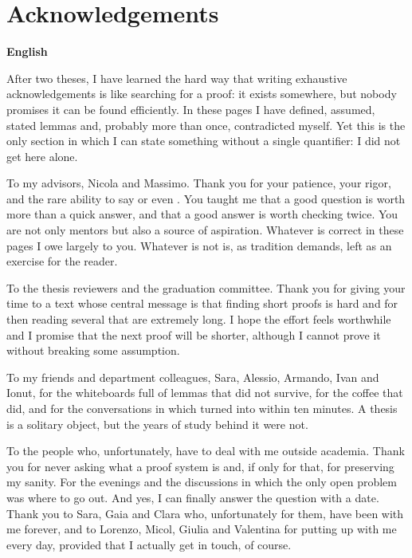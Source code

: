 \chapter*{Acknowledgements}

\noindent
\textbf{English}

\noindent
After two theses, I have learned the hard way that writing exhaustive acknowledgements is like searching for a proof: it exists somewhere, but nobody promises it can be found efficiently. In these pages I have defined, assumed, stated lemmas and, probably more than once, contradicted myself. Yet this is the only section in which I can state something without a single quantifier: I did not get here alone.

To my advisors, Nicola and Massimo. Thank you for your patience, your rigor, and the rare ability to say  or even . You taught me that a good question is worth more than a quick answer, and that a good answer is worth checking twice. You are not only mentors but also a source of aspiration. Whatever is correct in these pages I owe largely to you. Whatever is not is, as tradition demands, left as an exercise for the reader.

To the thesis reviewers and the graduation committee. Thank you for giving your time to a text whose central message is that finding short proofs is hard and for then reading several that are extremely long. I hope the effort feels worthwhile and I promise that the next proof will be shorter, although I cannot prove it without breaking some assumption.

To my friends and department colleagues, Sara, Alessio, Armando, Ivan and Ionut, for the whiteboards full of lemmas that did not survive, for the coffee that did, and for the conversations in which  turned into  within ten minutes. A thesis is a solitary object, but the years of study behind it were not.

To the people who, unfortunately, have to deal with me outside academia. Thank you for never asking what a proof system is and, if only for that, for preserving my sanity. For the evenings and the discussions in which the only open problem was where to go out. And yes, I can finally answer the question  with a date. Thank you to Sara, Gaia and Clara who, unfortunately for them, have been with me forever, and to Lorenzo, Micol, Giulia and Valentina for putting up with me every day, provided that I actually get in touch, of course.

